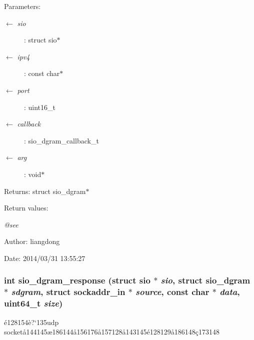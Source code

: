 \begin{Desc}
\item[Parameters:]
\begin{description}
\item[\mbox{$\leftarrow$} {\em sio}]: struct sio$\ast$ \item[\mbox{$\leftarrow$} {\em ipv4}]: const char$\ast$ \item[\mbox{$\leftarrow$} {\em port}]: uint16\_\-t \item[\mbox{$\leftarrow$} {\em callback}]: sio\_\-dgram\_\-callback\_\-t \item[\mbox{$\leftarrow$} {\em arg}]: void$\ast$ \end{description}
\end{Desc}
\begin{Desc}
\item[Returns:]struct sio\_\-dgram$\ast$ \end{Desc}
\begin{Desc}
\item[Return values:]
\begin{description}
\item[{\em @see}]\end{description}
\end{Desc}
\begin{Desc}
\item[Author:]liangdong \end{Desc}
\begin{Desc}
\item[Date:]2014/03/31 13:55:27 \end{Desc}
\subsubsection{\setlength{\rightskip}{0pt plus 5cm}int sio\_\-dgram\_\-response (struct sio $\ast$ {\em sio}, struct sio\_\-dgram $\ast$ {\em sdgram}, struct sockaddr\_\-in $\ast$ {\em source}, const char $\ast$ {\em data}, uint64\_\-t {\em size})}\label{sio__dgram_8c_a8}


\'{e}128154\`{e}?`135udp socket\aa{}144145\ae{}186144\aa{}156176\aa{}157128\aa{}143145\'{e}128129\aa{}186148\c{c}173148 

